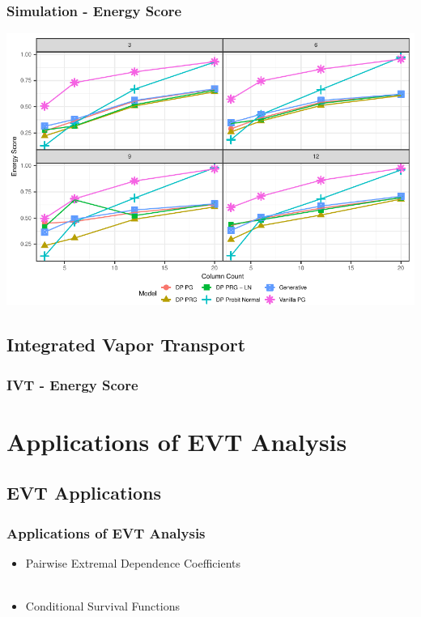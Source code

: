 \documentclass[aspectratio=169]{beamer}
\newlength{\frametextheight}
\begin{document}
\begin{frame}
  \frametitle{Simulation - Energy Score}
  \begin{center}
    \includegraphics[height=\frametextheight]{./images/simulation_es}
  \end{center}
\end{frame}

\subsection{Integrated Vapor Transport}

\begin{frame}
  \frametitle{IVT - Energy Score}
  \begin{center}
    
  \end{center}
\end{frame}

\section[EVT Applications]{Applications of EVT Analysis}
\subsection{EVT Applications}

\begin{frame}
  \frametitle{Applications of EVT Analysis}
  \begin{itemize}
    \item Pairwise Extremal Dependence Coefficients~\citep{warner2018}\\~\vspace{0.3cm}\\
    \item Conditional Survival Functions
  \end{itemize}
\end{frame}
\end{document}
